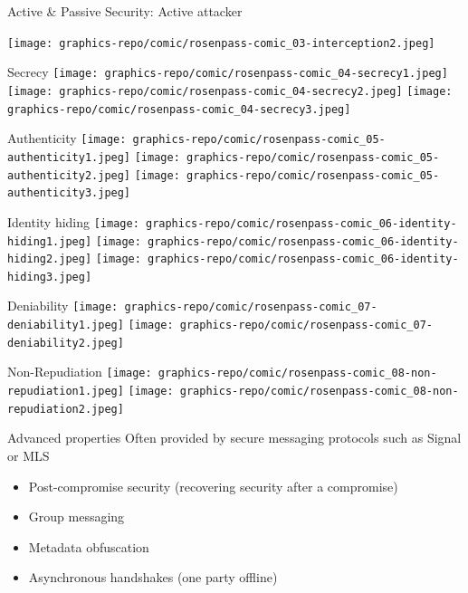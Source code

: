 \begin{frame}{Active \& Passive Security: Active attacker}
  \raggedright
  \texttt{[image: graphics-repo/comic/rosenpass-comic\_03-interception2.jpeg]}
\end{frame}

\begin{frame}{Secrecy}
  \centering
  \texttt{[image: graphics-repo/comic/rosenpass-comic\_04-secrecy1.jpeg]}
  \texttt{[image: graphics-repo/comic/rosenpass-comic\_04-secrecy2.jpeg]}
  \texttt{[image: graphics-repo/comic/rosenpass-comic\_04-secrecy3.jpeg]}
\end{frame}

\begin{frame}{Authenticity}
  \centering
  \texttt{[image: graphics-repo/comic/rosenpass-comic\_05-authenticity1.jpeg]}
  \texttt{[image: graphics-repo/comic/rosenpass-comic\_05-authenticity2.jpeg]}
  \texttt{[image: graphics-repo/comic/rosenpass-comic\_05-authenticity3.jpeg]}
\end{frame}

\begin{frame}{Identity hiding}
  \centering
  \texttt{[image: graphics-repo/comic/rosenpass-comic\_06-identity-hiding1.jpeg]}
  \texttt{[image: graphics-repo/comic/rosenpass-comic\_06-identity-hiding2.jpeg]}
  \texttt{[image: graphics-repo/comic/rosenpass-comic\_06-identity-hiding3.jpeg]}
\end{frame}

\begin{frame}{Deniability}
  \centering
  \texttt{[image: graphics-repo/comic/rosenpass-comic\_07-deniability1.jpeg]}
  \texttt{[image: graphics-repo/comic/rosenpass-comic\_07-deniability2.jpeg]}
\end{frame}

\begin{frame}{Non-Repudiation}
  \centering
  \texttt{[image: graphics-repo/comic/rosenpass-comic\_08-non-repudiation1.jpeg]}
  \texttt{[image: graphics-repo/comic/rosenpass-comic\_08-non-repudiation2.jpeg]}
\end{frame}

\begin{frame}{Advanced properties}
  Often provided by secure messaging protocols such as Signal or MLS

  \begin{itemize}
    \item Post-compromise security (recovering security after a compromise)
    \item Group messaging
    \item Metadata obfuscation
    \item Asynchronous handshakes (one party offline)
  \end{itemize}
\end{frame}

